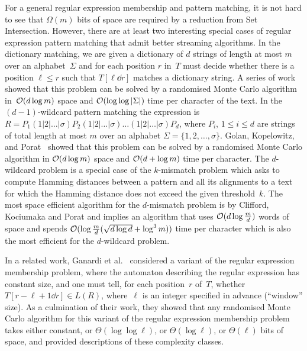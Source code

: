 For a general regular expression membership and pattern matching, it is not hard to see that $\Omega(m)$ bits of
space are required by a reduction from Set Intersection.
However, there are at least two interesting special cases of regular expression pattern matching that admit better streaming algorithms.
In the dictionary matching, we are given a dictionary of $d$ strings of length at most $m$ over an alphabet~$\Sigma$ and for each position $r$ in~$T$ must decide whether there is a position $\ell \le r$ such that $T[\ell \dd r]$ matches a dictionary string. A series of work~\cite{Porat:09,DBLP:journals/talg/BreslauerG14,DBLP:conf/esa/CliffordFPSS15,DBLP:conf/esa/GolanP17,DBLP:conf/icalp/GolanKP18} showed that this problem can be solved by a randomised Monte Carlo algorithm in~$\mathcal{O}(d \log m)$ space and $\mathcal{O}(\log \log |\Sigma|) $ time per character of the text.
In the $(d-1)$-wildcard pattern matching the expression is~$R = P_1 (1|2|\ldots|\sigma) P_2 (1|2|\ldots|\sigma) \ldots (1|2|\ldots|\sigma) P_{d}$, where $P_i$, $1 \le i \le d$ are strings of total length at most $m$ over an alphabet $\Sigma = \{1,2,\ldots,\sigma\}$. Golan, Kopelowitz, and Porat~\cite{DBLP:journals/algorithmica/GolanKP19} showed that this problem can be solved by a randomised Monte Carlo algorithm in $\mathcal{O}(d \log m)$ space and $\mathcal{O}(d+\log m)$ time per character.
The $d$-wildcard problem is a special case of the $k$-mismatch problem which asks to compute Hamming distances between a pattern and all its alignments to a text for which the Hamming distance does not exceed the given threshold~$k$.
The most space efficient algorithm for the $d$-mismatch problem is by Clifford, Kociumaka and Porat \cite{clifford2018streaming} and implies an algorithm that uses $\mathcal{O}(d\log \frac{m}{d})$ words of space and spends $\mathcal{O}(\log\frac{m}{d}(\sqrt{d\log d}+\log^3m))$ time per character which is also the most efficient for the $d$-wildcard problem.

In a related work, Ganardi et al.~\cite{ganardi_et_al:LIPIcs:2018:9131,DBLP:conf/lata/GanardiHL18,ganardi_et_al:LIPIcs:2018:8485,ganardi_et_al:LIPIcs:2016:6853} considered a variant of the regular expression membership problem, where the automaton describing the regular expression has constant size, and one must tell, for each position~$r$ of~$T$, whether $T[r-\ell+1\dd r] \in L(R)$, where~$\ell$ is an integer specified in advance (``window'' size). As a culmination of their work, they showed that any randomised Monte Carlo algorithm for this variant of the regular expression membership problem takes either constant, or $\Theta(\log\log \ell)$, or $\Theta(\log \ell)$, or $\Theta(\ell)$ bits of space, and provided descriptions of these complexity classes.

